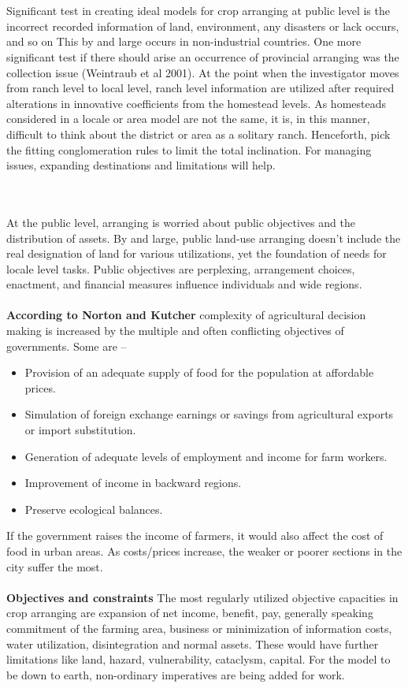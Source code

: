 \documentclass[conference]{IEEEtran}
\begin{document}
\\\\
Significant test in creating ideal models for crop arranging at public level is the incorrect recorded information of land, environment, any disasters or lack occurs, and so on This by and large occurs in non-industrial countries. One more significant test if there should arise an occurrence of provincial arranging was the collection issue (Weintraub et al 2001). At the point when the investigator moves from ranch level to local level, ranch level information are utilized after required alterations in innovative coefficients from the homestead levels. As homesteads considered in a locale or area model are not the same, it is, in this manner, difficult to think about the district or area as a solitary ranch. Henceforth, pick the fitting conglomeration rules to limit the total inclination. For managing issues, expanding destinations and limitations will help.

 \\\\
At the public level, arranging is worried about public objectives and the distribution of assets. By and large, public land-use arranging doesn't include the real designation of land for various utilizations, yet the foundation of needs for locale level tasks. Public objectives are perplexing, arrangement choices, enactment, and financial measures influence individuals and wide regions.
\\\\
\textbf{According to Norton and Kutcher} complexity of agricultural decision making is increased by the multiple and often conflicting objectives of governments. Some are –

\begin{itemize}
    \item {Provision of an adequate supply of food for the population at affordable prices.}
    \item {Simulation of foreign exchange earnings or savings from agricultural exports or import substitution.}
    \item {Generation of adequate levels of employment and income for farm workers.}
    \item {Improvement of income in backward regions.} 
    \item {Preserve ecological balances.}
\end{itemize}
If the government raises the income of farmers, it would also affect the cost of food in urban areas. As costs/prices increase, the weaker or poorer sections in the city suffer the most.
\\\\
\textbf{Objectives and constraints}
\newline
The most regularly utilized objective capacities in crop arranging are expansion of net income, benefit, pay, generally speaking commitment of the farming area, business or minimization of information costs, water utilization, disintegration and normal assets. These would have further limitations like land, hazard, vulnerability, cataclysm, capital. For the model to be down to earth, non-ordinary imperatives are being added for work.
\end{document}
